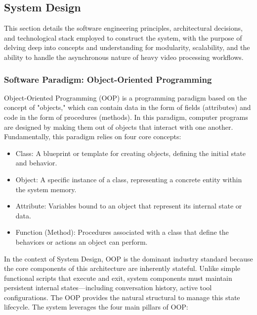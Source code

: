 \subsection{System Design}

This section details the software engineering principles, architectural decisions, and technological stack employed to construct the system, with the purpose of delving deep into concepts and understanding for modularity, scalability, and the ability to handle the asynchronous nature of heavy video processing workflows.

\subsubsection{Software Paradigm: Object-Oriented Programming}
Object-Oriented Programming (OOP) is a programming paradigm based on the concept of "objects," which can contain data in the form of fields (attributes) and code in the form of procedures (methods). In this paradigm, computer programs are designed by making them out of objects that interact with one another. Fundamentally, this paradigm relies on four core concepts:
\begin{itemize}
    \item Class: A blueprint or template for creating objects, defining the initial state and behavior.
    \item Object: A specific instance of a class, representing a concrete entity within the system memory.
    \item Attribute: Variables bound to an object that represent its internal state or data.
    \item Function (Method): Procedures associated with a class that define the behaviors or actions an object can perform.
\end{itemize}
In the context of System Design, OOP is the dominant industry standard because the core components of this architecture are inherently stateful. Unlike simple functional scripts that execute and exit, system components must maintain persistent internal states—including conversation history, active tool configurations. The OOP provides the natural structural to manage this state lifecycle. The system leverages the four main pillars of OOP:


